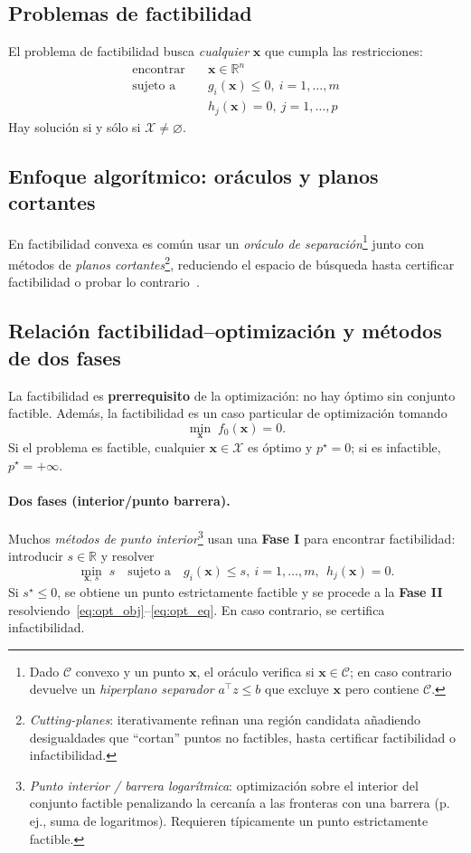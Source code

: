 \subsection{Problemas de factibilidad}
\label{sec:feas_problems}%
El problema de factibilidad busca \emph{cualquier} $\mathbf{x}$ que cumpla las restricciones:
\begin{align}
  \text{encontrar}\quad & \mathbf{x}\in\mathbb{R}^n \\
  \text{sujeto a}\quad  & g_i(\mathbf{x}) \le 0,\ i=1,\dots,m \\
                        & h_j(\mathbf{x}) = 0,\ j=1,\dots,p
\end{align}
Hay solución si y sólo si $\mathcal{X}\neq\varnothing$.

\subsection{Enfoque algorítmico: oráculos y planos cortantes}
En factibilidad convexa es común usar un \emph{oráculo de separación}\footnote{%
Dado $\mathcal{C}$ convexo y un punto $\mathbf{x}$, el oráculo verifica si $\mathbf{x}\in\mathcal{C}$; en caso contrario devuelve un \emph{hiperplano separador} $a^\top z \le b$ que excluye $\mathbf{x}$ pero contiene $\mathcal{C}$.}
junto con métodos de \emph{planos cortantes}\footnote{%
\emph{Cutting-planes}: iterativamente refinan una región candidata añadiendo desigualdades que “cortan” puntos no factibles, hasta certificar factibilidad o infactibilidad.},
reduciendo el espacio de búsqueda hasta certificar factibilidad o probar lo contrario~\cite{Sidford2020}.

\subsection{Relación factibilidad–optimización y métodos de dos fases}%
\label{sec:relation_containment}
La factibilidad es \textbf{prerrequisito} de la optimización: no hay óptimo sin conjunto factible. Además, la factibilidad es un caso particular de optimización tomando
\[
\min_{\mathbf{x}} \; f_0(\mathbf{x})=0.
\]
Si el problema es factible, cualquier $\mathbf{x}\in\mathcal{X}$ es óptimo y $p^\star=0$; si es infactible, $p^\star=+\infty$.

\paragraph{Dos fases (interior/punto barrera).}
Muchos \emph{métodos de punto interior}\footnote{%
\emph{Punto interior / barrera logarítmica}: optimización sobre el interior del conjunto factible penalizando la cercanía a las fronteras con una barrera (p.\,ej., suma de logaritmos). Requieren típicamente un punto estrictamente factible.}
usan una \textbf{Fase I} para encontrar factibilidad: introducir $s\in\mathbb{R}$ y resolver
\[
\min_{\mathbf{x},\,s}\; s\quad \text{sujeto a}\quad g_i(\mathbf{x})\le s,\ i=1,\dots,m,\ \ h_j(\mathbf{x})=0.
\]
Si $s^\star\le 0$, se obtiene un punto estrictamente factible y se procede a la \textbf{Fase II} resolviendo~\eqref{eq:opt_obj}–\eqref{eq:opt_eq}. En caso contrario, se certifica infactibilidad.

